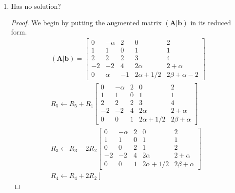\documentclass[11pt]{scrartcl}
\begin{document}
\begin{enumerate}[label=\alph*.]
	\item{
	      Has no solution?
	      \begin{proof}
		      We begin by putting the augmented matrix $(\mathbf{A}|\mathbf{b})$ in its reduced form.
		      \begin{align*}
			      (\mathbf{A}|\mathbf{b})=
			      \left [ \begin{array}{cccc|c}
					      0  & - \alpha & 2  & 0             & 2                  \\
					      1  & 1        & 0  & 1             & 1                  \\
					      2  & 2        & 2  & 3             & 4                  \\
					      -2 & -2       & 4  & 2\alpha       & 2 + \alpha         \\
					      0  & \alpha   & -1 & 2\alpha + 1/2 & 2\beta + \alpha -2
				      \end{array} \right ] \\
			      R_5 \leftarrow R_5 + R_1
			      \left [ \begin{array}{cccc|c}
					      0  & - \alpha & 2 & 0             & 2               \\
					      1  & 1        & 0 & 1             & 1               \\
					      2  & 2        & 2 & 3             & 4               \\
					      -2 & -2       & 4 & 2\alpha       & 2 + \alpha      \\
					      0  & 0        & 1 & 2\alpha + 1/2 & 2\beta + \alpha
				      \end{array} \right ] \\
			      R_3 \leftarrow R_3 - 2R_2
			      \left [ \begin{array}{cccc|c}
					      0  & - \alpha & 2 & 0             & 2               \\
					      1  & 1        & 0 & 1             & 1               \\
					      0  & 0        & 2 & 1             & 2               \\
					      -2 & -2       & 4 & 2\alpha       & 2 + \alpha      \\
					      0  & 0        & 1 & 2\alpha + 1/2 & 2\beta + \alpha
				      \end{array} \right ] \\
			      R_4 \leftarrow R_4 + 2 R_2
			      \left [ \begin{array}{cccc|c}

\end{array}
\end{align*}
\end{proof}}
\end{enumerate}
\end{document}

